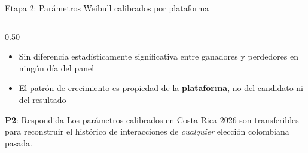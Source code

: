 \begin{frame}{Etapa 2: Parámetros Weibull calibrados por plataforma}
\begin{columns}[T]
\begin{column}{0.50\textwidth}
\begin{itemize}
        \item Sin diferencia estadísticamente significativa entre ganadores y perdedores en ningún día del panel
        \item El patrón de crecimiento es propiedad de la \textbf{plataforma}, no del candidato ni del resultado
      \end{itemize}
      \vspace{0.3em}
      \begin{exampleblock}{\textbf{P2}: Respondida}
        Los parámetros calibrados en Costa Rica 2026 son transferibles
        para reconstruir el histórico de interacciones de \textit{cualquier}
        elección colombiana pasada.
      \end{exampleblock}
    \end{column}
  \end{columns}
\end{frame}
\makeblue

